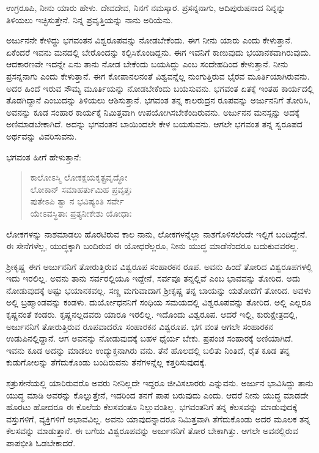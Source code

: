 {\small ಉಗ್ರರೂಪಿ, ನೀನು ಯಾರು ಹೇಳು. ದೇವದೇವ, ನಿನಗೆ ನಮಸ್ಕಾರ. ಪ್ರಸನ್ನನಾಗು, ಆದಿಪುರುಷನಾದ ನಿನ್ನನ್ನು ತಿಳಿಯಲು ಇಚ್ಛಿಸುತ್ತೇನೆ. ನಿನ್ನ ಪ್ರವೃತ್ತಿಯನ್ನು ನಾನು ಅರಿಯೆನು.}

ಅರ್ಜುನನೇ ಕೇಳಿದ್ದು ಭಗವಂತನ ವಿಶ್ವರೂಪವನ್ನು ನೋಡಬೇಕೆಂದು. ಈಗ ನೀನು ಯಾರು ಎಂದು ಕೇಳುತ್ತಾನೆ. ಏಕೆಂದರೆ ಇವನು ಮನದಲ್ಲಿ ಬೇರೊಂದನ್ನು ಕಲ್ಪಿಸಿಕೊಂಡಿದ್ದನು. ಈಗ ಇವನಿಗೆ ಕಾಣುವುದು ಭಯಾನಕವಾಗಿರುವುದು. ಆದಕಾರಣವೇ ಇದನ್ನೇ ಏನು ತಾನು ನೋಡ ಬೇಕೆಂದು ಬಯಸಿದ್ದು ಎಂಬ ಸಂದೇಹದಿಂದ ಕೇಳುತ್ತಾನೆ. ನೀನು ಪ್ರಸನ್ನನಾಗು ಎಂದು ಕೇಳುತ್ತಾನೆ. ಈಗ ಕೋಪಾನಲನಂತೆ ವಿಶ್ವವನ್ನೆಲ್ಲ ನುಂಗುತ್ತಿರುವ ಭೈರವ ಮೂರ್ತಿಯಾಗಿರುವನು. ಅದರ ಹಿಂದೆ ಇರುವ ಸೌಮ್ಯ ಮೂರ್ತಿಯನ್ನು ನೋಡಬೇಕೆಂದು ಬಯಸುವನು. ಭಗವಂತ ಏತಕ್ಕೆ ಇಂತಹ ಕಾರ್ಯದಲ್ಲಿ ತೊಡಗಿದ್ದಾನೆ ಎಂಬುದನ್ನು ತಿಳಿಯಲು ಆಶಿಸುತ್ತಾನೆ. ಭಗವಂತ ತನ್ನ ಕಾಲರುದ್ರನ ರೂಪವನ್ನು ಅರ್ಜುನನಿಗೆ ತೋರಿಸಿ, ಅವನನ್ನು ಕೂಡ ಸಂಹಾರ ಕಾರ್ಯಕ್ಕೆ ನಿಮಿತ್ತವಾಗಿ ಉಪಯೋಗಿಸಬೇಕೆಂದಿರುವನು. ಅರ್ಜುನನ ಮನಸ್ಸನ್ನು ಅದಕ್ಕೆ ಅಣಿಮಾಡಬೇಕಾಗಿದೆ. ಅದನ್ನು ಭಗವಂತನ ಬಾಯಿಂದಲೇ ಕೇಳ ಬಯಸುವನು. ಆಗಲೇ ಭಗವಂತ ತನ್ನ ಸ್ವರೂಪದ ಅರ್ಥವನ್ನು ವಿವರಿಸುವನು.

ಭಗವಂತ ಹೀಗೆ ಹೇಳುತ್ತಾನೆ:

\begin{verse}
ಕಾಲೋಽಸ್ಮಿ ಲೋಕಕ್ಷಯಕೃತ್ಪ್ರವೃದ್ಧೋ \\ ಲೋಕಾನ್ ಸಮಾಹರ್ತುಮಿಹ ಪ್ರವೃತ್ತಃ\\ಪುತೇಽಪಿ ತ್ವಾ ನ ಭವಿಷ್ಯಂತಿ ಸರ್ವೇ \\ ಯೇಽವಸ್ಥಿತಾಃ ಪ್ರತ್ಯನೀಕೇಶು ಯೋಧಾಃ 
\end{verse}

{\small ಲೋಕಗಳನ್ನು ನಾಶಮಾಡಲು ಹೊರಟಿರುವ ಕಾಲ ನಾನು, ಲೋಕಗಳನ್ನೆಲ್ಲಾ ನಾಶಗೊಳಿಸಲೆಂದೇ ಇಲ್ಲಿಗೆ ಬಂದಿದ್ದೇನೆ. ಈ ಸೇನೆಗಳೆಲ್ಲ, ಯುದ್ಧಕ್ಕಾಗಿ ಬಂದಿರುವ ಈ ಯೋಧರೆಲ್ಲರೂ, ನೀನು ಯುದ್ಧ ಮಾಡೆನೆಂದರೂ ಬದುಕುವವರಲ್ಲ. }

ಶ್ರೀಕೃಷ್ಣ ಈಗ ಅರ್ಜುನನಿಗೆ ತೋರುತ್ತಿರುವ ವಿಶ್ವರೂಪ ಸಂಹಾರಕನ ರೂಪ. ಅವನು ಹಿಂದೆ ತೋರಿದ ವಿಶ್ವರೂಪಗಳಲ್ಲಿ ಇದು ಇರಲಿಲ್ಲ. ಅವನು ತಾನು ಸರ್ವರಲ್ಲಿಯೂ ಇದ್ದೇನೆ, ಸರ್ವವೂ ತನ್ನಲ್ಲಿವೆ ಎಂಬ ಭಾವವನ್ನು ತೋರಿದ. ಅದು ನೋಡುವುದಕ್ಕೆ ಅಷ್ಟು ಭಯಾನಕವಲ್ಲ. ಸಣ್ಣ ಮಗುವಾದಾಗ ಶ್ರೀಕೃಷ್ಣ ತನ್ನ ಬಾಯನ್ನು ಯಶೋದೆಗೆ ತೋರಿದ. ಅವಳು ಅಲ್ಲಿ ಬ್ರಹ್ಮಾಂಡವನ್ನು ಕಂಡಳು. ದುರ್ಯೋಧನನಿಗೆ ಸಂಧಿಯ ಸಮಯದಲ್ಲಿ ವಿಶ್ವರೂಪವನ್ನು ತೋರಿದ. ಅಲ್ಲಿ ಎಲ್ಲರೂ ಕೃಷ್ಣನಂತೆ ಕಂಡರು. ಕೃಷ್ಣನಲ್ಲದವರು ಯಾರೂ ಇರಲಿಲ್ಲ. ಇದೊಂದು ವಿಶ್ವರೂಪ. ಆದರೆ ಇಲ್ಲಿ, ಕುರುಕ್ಷೇತ್ರದಲ್ಲಿ, ಅರ್ಜುನನಿಗೆ ತೋರುತ್ತಿರುವ ರೂಪವಾದರೊ ಸಂಹಾರಕನ ವಿಶ್ವರೂಪ. ಭಗ ವಂತ ಆಗಲೇ ಸಂಹಾರಕನ ಉಡುಪಿನಲ್ಲಿದ್ದಾನೆ. ಆಗ ಅವನನ್ನು ನೋಡುವುದಕ್ಕೆ ಬಹಳ ಧೈರ್ಯ ಬೇಕು. ಪ್ರಪಂಚ ಸಂಹಾರಕ್ಕೆ ಅಣಿಯಾಗಿದೆ. ಇವನು ಕೂಡ ಅದನ್ನು ಮಾಡಲು ಉದ್ಯುಕ್ತನಾಗಿರು ವನು. ತೆನೆ ಹೊಲದಲ್ಲಿ ಬಲಿತು ನಿಂತಿದೆ, ರೈತ ಕೂಡ ತನ್ನ ಕುಡುಗೋಲನ್ನು ತೆಗೆದುಕೊಂಡು ಬಂದಿರುವನು ತೆನೆಗಳನ್ನೆಲ್ಲ ಕತ್ತರಿಸುವುದಕ್ಕೆ.

ಶತ್ರುಸೇನೆಯಲ್ಲಿ ಯಾರಿರುವರೊ ಅವರು ನೀನಿಲ್ಲದೇ ಇದ್ದರೂ ಜೀವಿಸಲಾರರು ಎನ್ನುವನು. ಅರ್ಜುನ ಭಾವಿಸಿದ್ದು ತಾನು ಯುದ್ಧ ಮಾಡಿ ಅವರನ್ನು ಕೊಲ್ಲುತ್ತೇನೆ, ಇದರಿಂದ ತನಗೆ ಪಾಪ ಬರುವುದು ಎಂದು. ಆದರೆ ನೀನು ಯುದ್ಧ ಮಾಡದೇ ಹೊರಟು ಹೋದರೂ ಈ ಕೊಲೆಯ ಕೆಲಸವಂತೂ ನಿಲ್ಲುವಂತಿಲ್ಲ. ಭಗವಂತನಿಗೆ ತನ್ನ ಕೆಲಸವನ್ನು ಮಾಡುವುದಕ್ಕೆ ವಸ್ತುಗಳಿಗೆ, ವ್ಯಕ್ತಿಗಳಿಗೆ ಅಭಾವವಿಲ್ಲ. ಅವನು ಯಾವುದನ್ನಾದರೂ ನಿಮಿತ್ತವಾಗಿ ತೆಗೆದುಕೊಂಡು ಅದರ ಮೂಲಕ ತನ್ನ ಕೆಲಸವನ್ನು ಮಾಡುತ್ತಾನೆ. ಈ ಬಗೆಯ ವಿಶ್ವರೂಪವನ್ನು ಅರ್ಜುನನಿಗೆ ತೋರ ಬೇಕಾಗಿತ್ತು. ಆಗಲೇ ಅವನಲ್ಲಿರುವ ಪಾಪಭೀತಿ ಓಡಬೇಕಾದರೆ.

